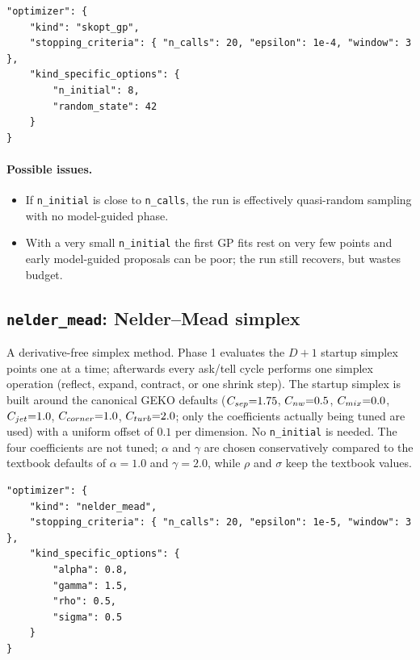 \begin{lstlisting}
"optimizer": {
    "kind": "skopt_gp",
    "stopping_criteria": { "n_calls": 20, "epsilon": 1e-4, "window": 3 },
    "kind_specific_options": {
        "n_initial": 8,
        "random_state": 42
    }
}
\end{lstlisting}

\paragraph{Possible issues.}
\begin{itemize}
  \item If \texttt{n\_initial} is close to \texttt{n\_calls}, the run is
        effectively quasi-random sampling with no model-guided phase.
  \item With a very small \texttt{n\_initial} the first GP fits rest on very
        few points and early model-guided proposals can be poor; the run
        still recovers, but wastes budget.
\end{itemize}

\subsection{\texttt{nelder\_mead}: Nelder--Mead simplex}
\label{sec:opt-nm}

A derivative-free simplex method.  Phase 1 evaluates the $D{+}1$ startup simplex points one at a
time; afterwards every ask/tell cycle performs one simplex operation
(reflect, expand, contract, or one shrink step).  The startup simplex is
built around the canonical GEKO defaults
($C_{sep}{=}1.75$, $C_{nw}{=}0.5$, $C_{mix}{=}0.0$, $C_{jet}{=}1.0$,
$C_{corner}{=}1.0$, $C_{turb}{=}2.0$; only the coefficients actually being
tuned are used) with a uniform offset of $0.1$ per dimension.  No
\texttt{n\_initial} is needed.  The four coefficients are not tuned;
$\alpha$ and $\gamma$ are chosen conservatively compared to the textbook
defaults of $\alpha = 1.0$ and $\gamma = 2.0$, while $\rho$ and $\sigma$
keep the textbook values.

\begin{lstlisting}
"optimizer": {
    "kind": "nelder_mead",
    "stopping_criteria": { "n_calls": 20, "epsilon": 1e-5, "window": 3 },
    "kind_specific_options": {
        "alpha": 0.8,
        "gamma": 1.5,
        "rho": 0.5,
        "sigma": 0.5
    }
}
\end{lstlisting}

